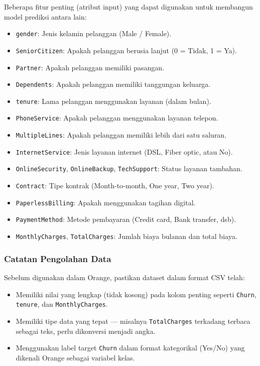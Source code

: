 Beberapa fitur penting (atribut input) yang dapat digunakan untuk membangun model prediksi antara lain:

\begin{itemize}
	\item \texttt{gender}: Jenis kelamin pelanggan (Male / Female).
	\item \texttt{SeniorCitizen}: Apakah pelanggan berusia lanjut (0 = Tidak, 1 = Ya).
	\item \texttt{Partner}: Apakah pelanggan memiliki pasangan.
	\item \texttt{Dependents}: Apakah pelanggan memiliki tanggungan keluarga.
	\item \texttt{tenure}: Lama pelanggan menggunakan layanan (dalam bulan).
	\item \texttt{PhoneService}: Apakah pelanggan menggunakan layanan telepon.
	\item \texttt{MultipleLines}: Apakah pelanggan memiliki lebih dari satu saluran.
	\item \texttt{InternetService}: Jenis layanan internet (DSL, Fiber optic, atau No).
	\item \texttt{OnlineSecurity}, \texttt{OnlineBackup}, \texttt{TechSupport}: Status layanan tambahan.
	\item \texttt{Contract}: Tipe kontrak (Month-to-month, One year, Two year).
	\item \texttt{PaperlessBilling}: Apakah menggunakan tagihan digital.
	\item \texttt{PaymentMethod}: Metode pembayaran (Credit card, Bank transfer, dsb).
	\item \texttt{MonthlyCharges}, \texttt{TotalCharges}: Jumlah biaya bulanan dan total biaya.
\end{itemize}

\subsubsection*{Catatan Pengolahan Data}

Sebelum digunakan dalam Orange, pastikan dataset dalam format CSV telah:
\begin{itemize}
	\item Memiliki nilai yang lengkap (tidak kosong) pada kolom penting seperti \texttt{Churn}, \texttt{tenure}, dan \texttt{MonthlyCharges}.
	\item Memiliki tipe data yang tepat — misalnya \texttt{TotalCharges} terkadang terbaca sebagai teks, perlu dikonversi menjadi angka.
	\item Menggunakan label target \texttt{Churn} dalam format kategorikal (Yes/No) yang dikenali Orange sebagai variabel kelas.
\end{itemize}

